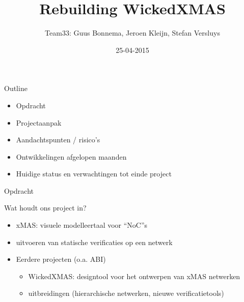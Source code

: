 \documentclass[10pt]{beamer}
\title[Plan]{Rebuilding WickedXMAS}
\author[Team33]{Team33: Guus Bonnema, Jeroen Kleijn, Stefan Versluys}
\date{25-04-2015}
\institute[OU nl]{Open University The Netherlands}
\begin{document}
\newcommand{\xmas}{x\textsc{mas}}%
\newcommand{\ok}{$\checkmark$}


\frame{\maketitle}   %



\begin{frame}[label=outline]{Outline}

    \begin{itemize}
        \item Opdracht
        \item Projectaanpak
        \item Aandachtspunten / risico's
        \item Ontwikkelingen afgelopen maanden
        \item Huidige status en verwachtingen tot einde project
    \end{itemize}

\end{frame}

\begin{frame}[label=opdracht]{Opdracht}
 
\par{Wat houdt ons project in?}

\begin{itemize}

    \item xMAS: visuele modelleertaal voor ``NoC''s
    \item uitvoeren van statische verificaties op een netwerk
    \item Eerdere projecten (o.a. ABI)
    \begin{itemize}
     \item WickedXMAS: designtool voor het ontwerpen van xMAS netwerken
     \item uitbreidingen (hierarchische netwerken, nieuwe verificatietools)
    \end{itemize}

\end{itemize}

 
\end{frame}
\end{document}
